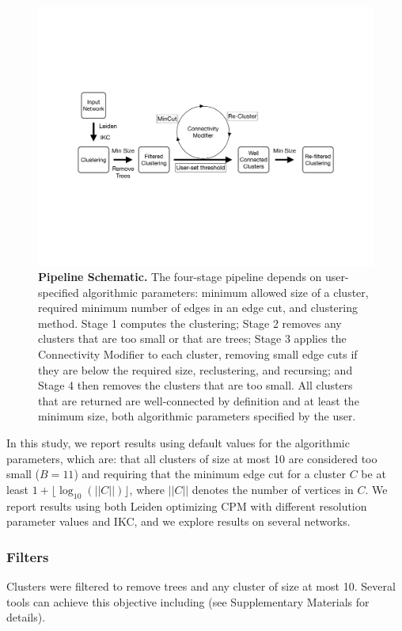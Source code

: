 \documentclass[11pt]{article}   	%
\begin{document}
\begin{figure}[H]
\centering
\includegraphics[width=0.8\linewidth]{figs/workflow.pdf}
\caption{\textbf{Pipeline Schematic.} The four-stage pipeline depends on user-specified algorithmic parameters: minimum allowed size of a cluster, required minimum number of edges in an edge cut, and clustering method.  Stage 1 computes the clustering; Stage 2 removes any clusters that are too small or that are trees;  Stage 3 applies the  Connectivity Modifier to each cluster, removing small edge cuts if they are below the required size, reclustering, and recursing;  and Stage 4 then removes the clusters that are too small. All clusters that are returned are well-connected by definition and at least the minimum size, both algorithmic parameters specified by the user.}
\end{figure}




In this study, we report results using default values for the algorithmic parameters, which are: that all clusters of size at most 10 are considered too small ($B=11$) and requiring that the minimum edge cut for a cluster $C$ be at least  $ 1+ \lfloor \log_{10}(||C||) \rfloor$,  where $||C||$ denotes the number of vertices in $C$.
We report results using both Leiden optimizing CPM with different resolution parameter values and IKC, and we explore results on several networks.


\subsubsection{Filters} Clusters were filtered to remove trees and any cluster of size at most 10. Several tools can achieve this objective including \cite{belinda2022} (see Supplementary Materials for details).
\end{document}
